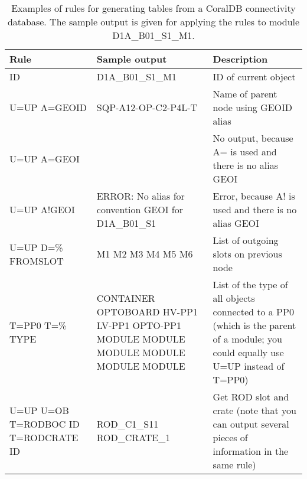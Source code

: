 \begin{table}[p]
\begin{center}
\begin{tabular}{|p{5.5cm}|p{5.5cm}|p{4.5cm}|}
\hline
Rule & 	Sample output & 	Description \\ \hline \hline
ID & 	D1A\_B01\_S1\_M1 & 	ID of current object \\ \hline
U=UP A=GEOID & 	SQP-A12-OP-C2-P4L-T & 	Name of parent node using GEOID alias \\ \hline
U=UP A=GEOI & 	 & No output, because A= is used and there is no alias GEOI \\ \hline
U=UP A!GEOI & ERROR: No alias for convention GEOI for D1A\_B01\_S1 & Error, because A! is used and there is no alias GEOI \\ \hline
U=UP D=\% FROMSLOT & M1 \newline
M2 \newline
M3 \newline
M4 \newline
M5 \newline
M6 & 	List of outgoing slots on previous node \\ \hline
T=PP0 T=\% TYPE & 	CONTAINER \newline
OPTOBOARD \newline
HV-PP1 \newline
LV-PP1 \newline
OPTO-PP1 \newline
MODULE \newline
MODULE \newline
MODULE \newline
MODULE \newline
MODULE \newline
MODULE & 	List of the type of all objects connected to a PP0 (which is the parent of a module; you could equally use U=UP instead of T=PP0) \\ \hline
U=UP U=OB T=RODBOC ID T=RODCRATE ID & 	ROD\_C1\_S11 ROD\_CRATE\_1 & 	Get ROD slot and crate (note that you can output several pieces of information in the same rule) \\ \hline
\end{tabular}
\caption[Examples of rules]
{Examples of rules for generating tables from a CoralDB connectivity
database. The sample output is given for applying the rules to module D1A\_B01\_S1\_M1.}
\label{CORALDBRULES-examples}
\end{center}
\end{table}

\endgroup
